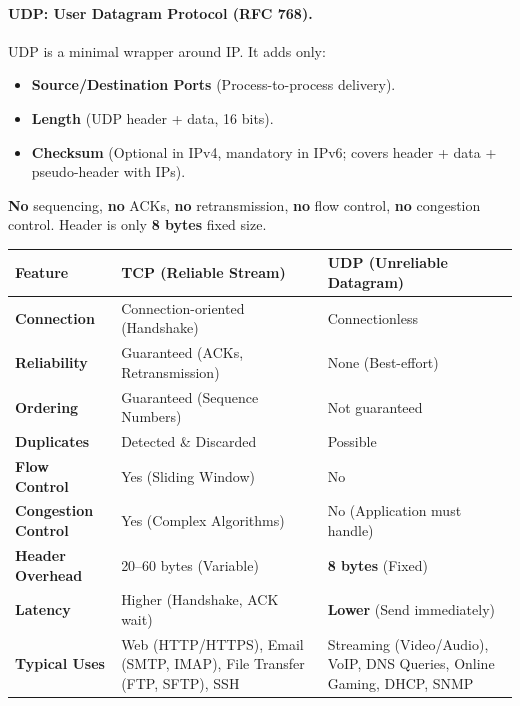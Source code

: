 \documentclass[11pt]{article}
\begin{document}
\paragraph{UDP: User Datagram Protocol (RFC 768).}
UDP is a minimal wrapper around IP. It adds only:
\begin{itemize}
    \item \textbf{Source/Destination Ports} (Process-to-process delivery).
    \item \textbf{Length} (UDP header + data, 16 bits).
    \item \textbf{Checksum} (Optional in IPv4, mandatory in IPv6; covers header + data + pseudo-header with IPs).
\end{itemize}
\textbf{No} sequencing, \textbf{no} ACKs, \textbf{no} retransmission, \textbf{no} flow control, \textbf{no} congestion control. Header is only \textbf{8 bytes} fixed size.

\begin{propriete}
\begin{center}
\begin{tabularx}{\linewidth}{|l|X|X|}
\hline
\rowcolor{popblueL}
\textbf{Feature} & \textbf{TCP (Reliable Stream)} & \textbf{UDP (Unreliable Datagram)} \\
\hline
\textbf{Connection} & Connection-oriented (Handshake) & Connectionless \\
\hline
\textbf{Reliability} & Guaranteed (ACKs, Retransmission) & None (Best-effort) \\
\hline
\textbf{Ordering} & Guaranteed (Sequence Numbers) & Not guaranteed \\
\hline
\textbf{Duplicates} & Detected \& Discarded & Possible \\
\hline
\textbf{Flow Control} & Yes (Sliding Window) & No \\
\hline
\textbf{Congestion Control} & Yes (Complex Algorithms) & No (Application must handle) \\
\hline
\textbf{Header Overhead} & 20--60 bytes (Variable) & \textbf{8 bytes} (Fixed) \\
\hline
\textbf{Latency} & Higher (Handshake, ACK wait) & \textbf{Lower} (Send immediately) \\
\hline
\textbf{Typical Uses} & Web (HTTP/HTTPS), Email (SMTP, IMAP), File Transfer (FTP, SFTP), SSH & Streaming (Video/Audio), VoIP, DNS Queries, Online Gaming, DHCP, SNMP \\
\hline
\end{tabularx}
\end{center}
\end{propriete}
\end{document}
